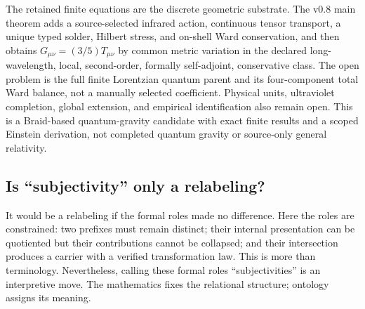 The retained finite equations are the discrete geometric substrate. The v0.8 main theorem adds a source-selected infrared action, continuous tensor transport, a unique typed solder, Hilbert stress, and on-shell Ward conservation, and then obtains $G_{\mu\nu}=(3/5)T_{\mu\nu}$ by common metric variation in the declared long-wavelength, local, second-order, formally self-adjoint, conservative class. The open problem is the full finite Lorentzian quantum parent and its four-component total Ward balance, not a manually selected coefficient. Physical units, ultraviolet completion, global extension, and empirical identification also remain open. This is a Braid-based quantum-gravity candidate with exact finite results and a scoped Einstein derivation, not completed quantum gravity or source-only general relativity.

\subsection{Is ``subjectivity'' only a relabeling?}

It would be a relabeling if the formal roles made no difference. Here the roles are constrained: two prefixes must remain distinct; their internal presentation can be quotiented but their contributions cannot be collapsed; and their intersection produces a carrier with a verified transformation law. This is more than terminology. Nevertheless, calling these formal roles ``subjectivities'' is an interpretive move. The mathematics fixes the relational structure; ontology assigns its meaning.

